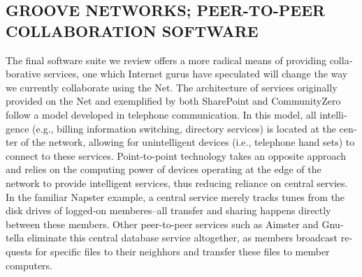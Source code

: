\begin{latin}
\section*{GROOVE NETWORKS; PEER-TO-PEER COLLABORATION SOFTWARE}
The final software suite we review offers a more radical means of providing collaborative services, one which Internet gurus have speculated will change the way we currently collaborate using the Net. The architecture of services originally provided on the Net and exemplified by both SharePoint and CommunityZero follow a model developed in telephone communication. In this model, all intelligence (e.g., billing information switching, directory services) is located at the  center of the network, allowing for unintelligent devices (i.e., telephone hand sets) to connect to these services. Point-to-point technology takes  an opposite approach and relies on the computing power of devices operating at the edge of the network to provide intelligent services, thus reducing reliance on central servies. In the familiar Napster example, a central service merely tracks tunes from the disk drives of logged-on memberes--all transfer and sharing happens directly between these members. Other peer-to-peer services such as Aimster and Gnutella eliminate this central database service altogether, as members broadcast requests for specific files to their neighhors and transfer these files to member computers.


\end{latin}
